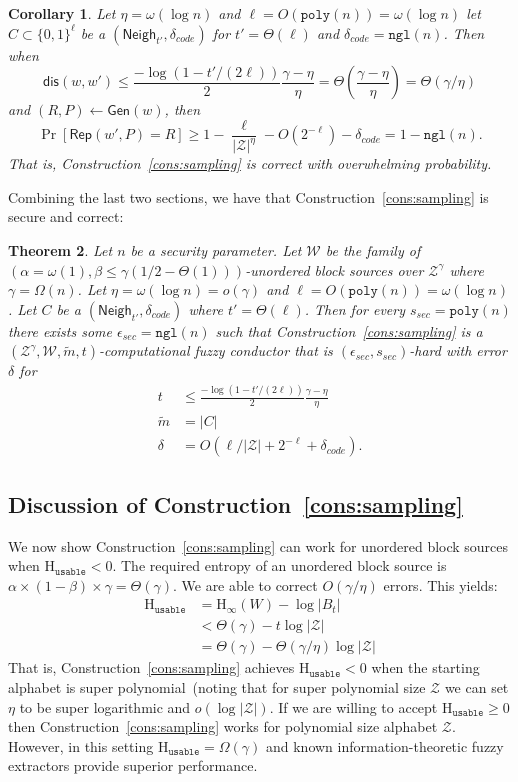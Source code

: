 \documentclass[11pt]{article}
\newcommand{\consref}[1]{\mbox{Construction~\ref{#1}}}
\newcommand{\class}[1]{{\ensuremath{\mathsf{#1}}}}
\newcommand{\gen}{\ensuremath{\class{Gen}}\xspace}
\newcommand{\rep}{\ensuremath{\class{Rep}}\xspace}
\newcommand{\zo}{\ensuremath{\{0, 1\}}}
\newcommand{\neigh}{\ensuremath{\class{Neigh}}\xspace}
\newcommand{\dis}{\ensuremath{\mathsf{dis}}}
\newcommand{\poly}{\ensuremath{\mathtt{poly}}\xspace}
\newcommand{\ngl}{\ensuremath{\mathtt{ngl}}\xspace}
\newcommand{\Hoo}{\mathrm{H}_\infty}
\newcommand{\Huse}{\mathrm{H}_{\mathtt{usable}}}
\newtheorem{theorem}{Theorem}[section]
\newtheorem{corollary}[theorem]{Corollary}
\begin{document}
\begin{corollary}
Let $\eta= \omega(\log n)$ and $\ell = O(\poly(n)) = \omega(\log n)$ let $C\subset\zo^\ell$ be a $(\neigh_{t'}, \delta_{code})$ for $t' = \Theta(\ell)$ and $\delta_{code} = \ngl(n)$.  Then when
\[
\dis(w, w')\le \frac{-\log(1-t'/(2\ell))}{2}\frac{\gamma-\eta}{\eta} = \Theta(\frac{\gamma-\eta}{\eta}) = \Theta(\gamma/\eta)
\]
and $(R, P)\leftarrow \gen(w)$, then
\[
\Pr[\rep( w', P) = R] \geq 1-\frac{\ell}{|\mathcal{Z}|^\eta} - O(2^{-\ell}) -\delta_{code}= 1-\ngl(n).
\]
That is, \consref{cons:sampling} is correct with overwhelming probability.

\end{corollary}

Combining the last two sections, we have that \consref{cons:sampling} is secure and correct:
\begin{theorem}
Let $n$ be a security parameter.
Let $\mathcal{W}$ be the family of $(\alpha = \omega(1), \beta\leq \gamma(1/2-\Theta(1)))$-unordered block sources over $\mathcal{Z}^\gamma$ where $\gamma = \Omega(n)$.  Let $\eta = \omega(\log n) = o(\gamma)$ and $\ell = O(\poly(n)) = \omega(\log n)$.  Let $C$ be a $(\neigh_{t'}, \delta_{code})$ where $t' = \Theta(\ell)$.  Then for every $s_{sec} = \poly(n)$ there exists some $\epsilon_{sec} = \ngl(n)$ such that \consref{cons:sampling} is a $(\mathcal{Z}^\gamma, \mathcal{W}, \tilde{m}, t)$-computational fuzzy conductor that is $(\epsilon_{sec}, s_{sec})$-hard with error $\delta$ for
\begin{align*}
t&\le \frac{-\log(1-t'/(2\ell))}{2}\frac{\gamma-\eta}{\eta} \\
\tilde{m} &=|C|\\
\delta &= O(\ell/|\mathcal{Z}|+2^{-\ell} +\delta_{code}).
\end{align*}
\end{theorem}

\subsection{Discussion of \consref{cons:sampling}}
We now show \consref{cons:sampling} can work for unordered block sources when $\Huse<0$.  The required entropy of  an unordered block source is $\alpha\times (1-\beta )\times \gamma = \Theta(\gamma)$.  We are able to correct $O(\gamma/\eta)$ errors.
This yields:
\begin{align*}
\Huse &= \Hoo(W) -\log |B_t| \\
&< \Theta(\gamma)- t \log |\mathcal{Z}|\\
&= \Theta(\gamma) - \Theta(\gamma/\eta) \log |\mathcal{Z}|
\end{align*}
That is, \consref{cons:sampling} achieves $\Huse<0$ when the starting alphabet is super polynomial~(noting that for super polynomial size $\mathcal{Z}$ we can set $\eta$ to be super logarithmic and $o(\log |\mathcal{Z}|)$.  If we are willing to accept $\Huse\geq 0$ then \consref{cons:sampling} works for polynomial size alphabet $\mathcal{Z}$.  However, in this setting $\Huse =\Omega(\gamma)$ and known information-theoretic fuzzy extractors provide superior performance.


\end{document}
